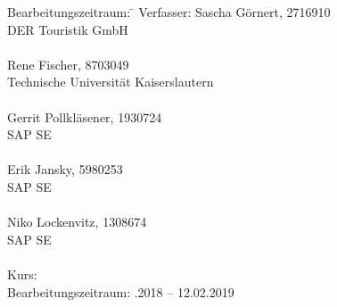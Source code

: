 \begin{titlepage}
\begin{center}
\begin{minipage}{\textwidth}
		\begin{tabbing}
			Bearbeitungszeitraum: \hspace{0.85cm}\=\kill
			Verfasser: \> Sascha Görnert, 2716910 \\
			\> DER Touristik GmbH \\
			\> \\
			\> Rene Fischer, 8703049 \\
			\> Technische Universität Kaiserslautern \\
			\> \\
			\> Gerrit Pollkläsener, 1930724 \\
			\> SAP SE \\
			\> \\
			\> Erik Jansky, 5980253 \\
			\> SAP SE \\
			\> \\
			\> Niko Lockenvitz, 1308674 \\
			\> SAP SE \\
			\> \\[1.5mm]
			Kurs: \> \DieKursbezeichnung \\[1.5mm]
			Bearbeitungszeitraum: .2018 -- 12.02.2019
	\end{tabbing}

	\end{minipage}

\end{center}

\end{titlepage}